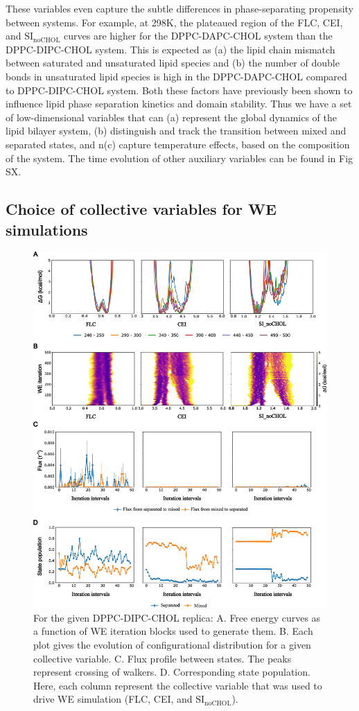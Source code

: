 \documentclass{biophys-new}
\begin{document}
These variables even capture the subtle differences in phase-separating propensity between systems.
For example, at 298K, the plateaued region of the FLC, CEI, and $\text{SI}_{\text{noCHOL}}$ curves are higher for the DPPC-DAPC-CHOL system than the DPPC-DIPC-CHOL system.
This is expected as (a) the lipid chain mismatch between saturated and unsaturated lipid species and (b) the number of double bonds in unsaturated lipid species is high in the DPPC-DAPC-CHOL compared to DPPC-DIPC-CHOL system.
Both these factors have previously been shown to influence lipid phase separation kinetics and domain stability\cite{Fowler2016, Lin2016}.
Thus we have a set of low-dimensional variables that can (a) represent the global dynamics of the lipid bilayer system,
(b) distinguish and track the transition between mixed and separated states, and n(c) capture temperature effects,
based on the composition of the system.
The time evolution of other auxiliary variables can be found in Fig SX.

\subsection*{Choice of collective variables for WE simulations}

\begin{figure}[hbt!]
\centering
\includegraphics[width=0.92\linewidth]{Figures/Main/4/placeholder1.jpg}
\caption{For the given DPPC-DIPC-CHOL replica: A. Free energy curves as a function of WE iteration blocks used to generate them. B. Each plot gives the evolution of configurational distribution for a given collective variable. C. Flux profile between states. The peaks represent crossing of walkers. D. Corresponding state population. Here, each column represent the collective variable that was used to drive WE simulation (FLC, CEI, and $\text{SI}_{\text{noCHOL}}$).}
\label{figs4:view}
\end{figure}
\end{document}
